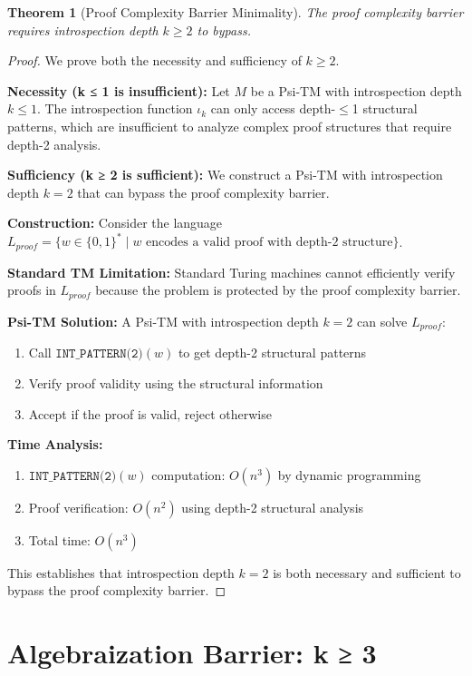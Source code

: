 \documentclass[11pt]{article}
\newtheorem{theorem}{Theorem}
\begin{document}
\begin{theorem}[Proof Complexity Barrier Minimality]
The proof complexity barrier requires introspection depth $k \geq 2$ to bypass.
\end{theorem}

\begin{proof}
We prove both the necessity and sufficiency of $k \geq 2$.

\textbf{Necessity (k ≤ 1 is insufficient):}
Let $M$ be a Psi-TM with introspection depth $k \leq 1$. The introspection function $\iota_k$ can only access depth-$\leq$1 structural patterns, which are insufficient to analyze complex proof structures that require depth-2 analysis.

\textbf{Sufficiency (k ≥ 2 is sufficient):}
We construct a Psi-TM with introspection depth $k = 2$ that can bypass the proof complexity barrier.

\textbf{Construction:}
Consider the language $L_{proof} = \{w \in \{0,1\}^* \mid w \text{ encodes a valid proof with depth-2 structure}\}$.

\textbf{Standard TM Limitation:}
Standard Turing machines cannot efficiently verify proofs in $L_{proof}$ because the problem is protected by the proof complexity barrier.

\textbf{Psi-TM Solution:}
A Psi-TM with introspection depth $k = 2$ can solve $L_{proof}$:
\begin{enumerate}
\item Call $\texttt{INT\_PATTERN(2)}(w)$ to get depth-2 structural patterns
\item Verify proof validity using the structural information
\item Accept if the proof is valid, reject otherwise
\end{enumerate}

\textbf{Time Analysis:}
\begin{enumerate}
\item $\texttt{INT\_PATTERN(2)}(w)$ computation: $O(n^3)$ by dynamic programming
\item Proof verification: $O(n^2)$ using depth-2 structural analysis
\item Total time: $O(n^3)$
\end{enumerate}

This establishes that introspection depth $k = 2$ is both necessary and sufficient to bypass the proof complexity barrier.
\end{proof}

\section{Algebraization Barrier: k ≥ 3}
\end{document}
